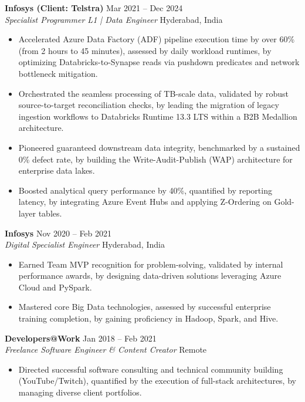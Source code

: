 \documentclass[10pt, letterpaper]{article}
\begin{document}
\vspace{4pt}

\noindent \textbf{Infosys (Client: Telstra)} \hfill Mar 2021 -- Dec 2024 \\
\textit{Specialist Programmer L1 | Data Engineer} \hfill Hyderabad, India
\begin{itemize}
    \setlength{\itemsep}{1pt}
    \item Accelerated Azure Data Factory (ADF) pipeline execution time by over 60\% (from 2 hours to 45 minutes), assessed by daily workload runtimes, by optimizing Databricks-to-Synapse reads via pushdown predicates and network bottleneck mitigation.
    \item Orchestrated the seamless processing of TB-scale data, validated by robust source-to-target reconciliation checks, by leading the migration of legacy ingestion workflows to Databricks Runtime 13.3 LTS within a B2B Medallion architecture.
    \item Pioneered guaranteed downstream data integrity, benchmarked by a sustained 0\% defect rate, by building the Write-Audit-Publish (WAP) architecture for enterprise data lakes.
    \item Boosted analytical query performance by 40\%, quantified by reporting latency, by integrating Azure Event Hubs and applying Z-Ordering on Gold-layer tables.
\end{itemize}

\vspace{4pt}

\noindent \textbf{Infosys} \hfill Nov 2020 -- Feb 2021 \\
\textit{Digital Specialist Engineer} \hfill Hyderabad, India
\begin{itemize}
    \setlength{\itemsep}{1pt}
    \item Earned Team MVP recognition for problem-solving, validated by internal performance awards, by designing data-driven solutions leveraging Azure Cloud and PySpark.
    \item Mastered core Big Data technologies, assessed by successful enterprise training completion, by gaining proficiency in Hadoop, Spark, and Hive.
\end{itemize}

\vspace{4pt}

\noindent \textbf{Developers@Work} \hfill Jan 2018 -- Feb 2021 \\
\textit{Freelance Software Engineer \& Content Creator} \hfill Remote
\begin{itemize}
    \setlength{\itemsep}{1pt}
    \item Directed successful software consulting and technical community building (YouTube/Twitch), quantified by the execution of full-stack architectures, by managing diverse client portfolios.
\end{itemize}
\end{document}
